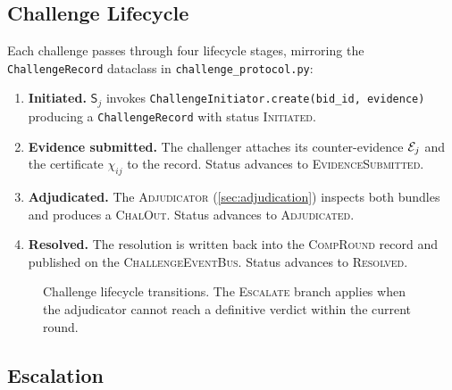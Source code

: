 \documentclass[11pt]{article}
\providecommand{\Strat}{\mathsf{S}}               %
\providecommand{\CompRound}{\textsc{CompRound}}   %
\providecommand{\ChalOut}{\textsc{ChalOut}}       %
\providecommand{\ESCALATE}{\textsc{Escalate}}
\begin{document}
\subsection{Challenge Lifecycle}

Each challenge passes through four lifecycle stages, mirroring the
\texttt{ChallengeRecord} dataclass in \texttt{challenge\_protocol.py}:

\begin{enumerate}[label=\textbf{Stage \arabic*.}]
  \item \textbf{Initiated.}
    $\Strat_j$ invokes \texttt{ChallengeInitiator.create(bid\_id, evidence)}
    producing a \texttt{ChallengeRecord} with status \textsc{Initiated}.

  \item \textbf{Evidence submitted.}
    The challenger attaches its counter-evidence $\mathcal{E}_j$ and the certificate
    $\chi_{ij}$ to the record.  Status advances to \textsc{EvidenceSubmitted}.

  \item \textbf{Adjudicated.}
    The \textsc{Adjudicator} (\cref{sec:adjudication}) inspects both bundles
    and produces a \ChalOut{}.  Status advances to \textsc{Adjudicated}.

  \item \textbf{Resolved.}
    The resolution is written back into the \CompRound{} record and published
    on the \textsc{ChallengeEventBus}.  Status advances to \textsc{Resolved}.
\end{enumerate}

\begin{figure}[H]
\centering
{}
\caption{Challenge lifecycle transitions.  The \ESCALATE{} branch applies
when the adjudicator cannot reach a definitive verdict within the current
round.}
\label{fig:lifecycle}
\end{figure}

\subsection{Escalation}
\end{document}
